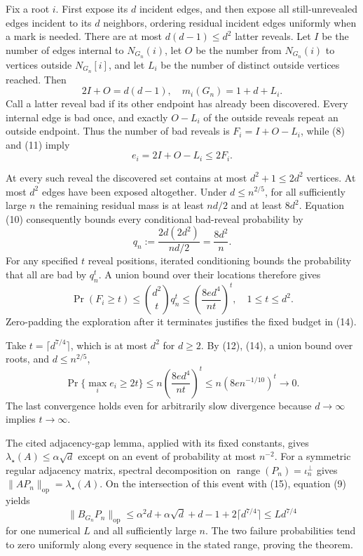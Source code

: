 Fix a root \(i\).  First expose its \(d\) incident edges, and then expose
all still-unrevealed edges incident to its \(d\) neighbors, ordering
residual incident edges uniformly when a mark is needed.  There are at
most \(d(d-1)\le d^2\) latter reveals.  Let \(I\) be the number of edges
internal to \(N_{G_n}(i)\), let \(O\) be the number from
\(N_{G_n}(i)\) to vertices outside \(N_{G_n}[i]\), and let \(L_i\) be
the number of distinct outside vertices reached.  Then
\[
2I+O=d(d-1),\quad m_i(G_n)=1+d+L_i.
\tag{11}
\]
Call a latter reveal bad if its other endpoint has already been discovered.
Every internal edge is bad once, and exactly \(O-L_i\) of the outside
reveals repeat an outside endpoint.  Thus the number of bad reveals is
\(F_i=I+O-L_i\), while (8) and (11) imply
\[
e_i=2I+O-L_i\le2F_i.
\tag{12}
\]

At every such reveal the discovered set contains at most \(d^2+1\le2d^2\)
vertices.  At most \(d^2\) edges have been exposed altogether.  Under
\(d\le n^{2/5}\), for all sufficiently large \(n\) the remaining residual
mass is at least \(nd/2\) and at least \(8d^2\).  Equation (10) consequently
bounds every conditional bad-reveal probability by
\[
q_n:=\frac{2d(2d^2)}{nd/2}=\frac{8d^2}{n}.
\tag{13}
\]
For any specified \(t\) reveal positions, iterated conditioning bounds the
probability that all are bad by \(q_n^t\).  A union bound over their
locations therefore gives
\[
\Pr(F_i\ge t)\le {d^2\choose t}q_n^t
\le\left(\frac{8e d^4}{nt}\right)^t,
\quad 1\le t\le d^2.
\tag{14}
\]
Zero-padding the exploration after it terminates justifies the fixed
budget in (14).

Take \(t=\lceil d^{7/4}\rceil\), which is at most \(d^2\) for \(d\ge2\).
By (12), (14), a union bound over roots, and \(d\le n^{2/5}\),
\[
\Pr\{\max_i e_i\ge2t\}
\le n\left(\frac{8e d^4}{nt}\right)^t
\le n\left(8e n^{-1/10}\right)^t
\longrightarrow0.
\tag{15}
\]
The last convergence holds even for arbitrarily slow divergence because
\(d\to\infty\) implies \(t\to\infty\).

The cited adjacency-gap lemma, applied with its fixed constants, gives
\(\lambda_\star(A)\le\alpha\sqrt d\) except on an event of probability at
most \(n^{-2}\).  For a symmetric regular adjacency matrix, spectral
decomposition on \(\operatorname{range}(P_n)=\iota_n^\perp\) gives
\(\|AP_n\|_{\mathrm{op}}=\lambda_\star(A)\).  On the intersection of this
event with (15), equation (9) yields
\[
\|B_{G_n}P_n\|_{\mathrm{op}}
\le \alpha^2d+\alpha\sqrt d+d-1+2\lceil d^{7/4}\rceil
\le Ld^{7/4}
\]
for one numerical \(L\) and all sufficiently large \(n\).  The two failure
probabilities tend to zero uniformly along every sequence in the stated
range, proving the theorem.

